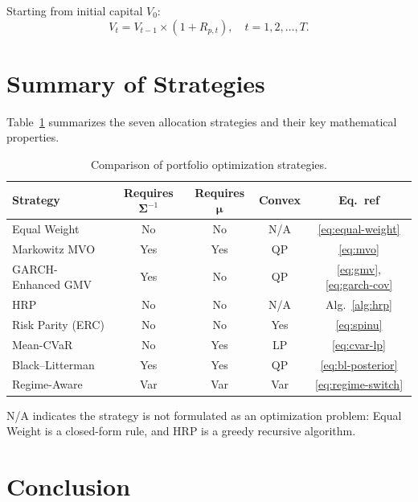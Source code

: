 \documentclass[12pt,a4paper]{article}
\begin{document}
Starting from initial capital $V_0$:
\begin{equation}
    V_t = V_{t-1} \times (1 + R_{p,t}), \quad t = 1, 2, \ldots, T.
    \label{eq:equity}
\end{equation}

\section{Summary of Strategies}
\label{sec:summary}

Table~\ref{tab:strategies} summarizes the seven allocation strategies and their key mathematical properties.

\begin{table}[H]
\centering
\caption{Comparison of portfolio optimization strategies.}
\label{tab:strategies}
\small
\begin{tabular}{@{}lcccc@{}}
\toprule
\textbf{Strategy} & \textbf{Requires $\bm{\Sigma}^{-1}$} & \textbf{Requires $\bm{\mu}$} & \textbf{Convex} & \textbf{Eq.\ ref} \\
\midrule
Equal Weight         & No  & No  & N/A  & \eqref{eq:equal-weight} \\
Markowitz MVO        & Yes & Yes & QP   & \eqref{eq:mvo} \\
GARCH-Enhanced GMV   & Yes & No  & QP   & \eqref{eq:gmv}, \eqref{eq:garch-cov} \\
HRP                  & No  & No  & N/A  & Alg.~\ref{alg:hrp} \\
Risk Parity (ERC)    & No  & No  & Yes  & \eqref{eq:spinu} \\
Mean-CVaR            & No  & Yes & LP   & \eqref{eq:cvar-lp} \\
Black--Litterman     & Yes & Yes & QP   & \eqref{eq:bl-posterior} \\
Regime-Aware         & Var & Var & Var  & \eqref{eq:regime-switch} \\
\bottomrule
\end{tabular}
\smallskip

\noindent\small N/A indicates the strategy is not formulated as an optimization problem: Equal Weight is a closed-form rule, and HRP is a greedy recursive algorithm.
\end{table}

\section{Conclusion}
\end{document}
